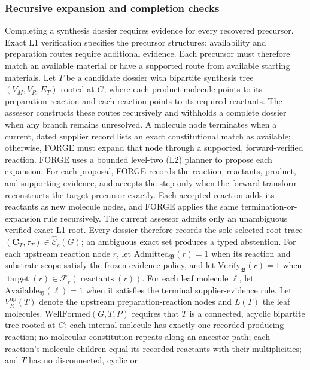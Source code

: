\subsubsection{Recursive expansion and completion checks}

Completing a synthesis dossier requires evidence for every recovered precursor. Exact L1
verification specifies the precursor structures; availability and preparation routes require
additional evidence. Each precursor must therefore match an available material or have a supported
route from available starting materials.
Let $T$ be a candidate dossier with bipartite synthesis tree $(V_M,V_R,E_T)$ rooted at $G$, where each product molecule
points to its preparation reaction and each reaction points to its required reactants.
The assessor constructs these routes recursively and withholds a complete dossier when any branch
remains unresolved.
A molecule node terminates when a current, dated supplier record lists an exact constitutional match
as available; otherwise, FORGE must expand that node through a supported, forward-verified reaction.
FORGE uses a bounded level-two (L2) planner to propose each expansion.
For each proposal, FORGE records the reaction, reactants, product, and supporting evidence, and
accepts the step only when the forward transform reconstructs the target precursor exactly.
Each accepted reaction adds its reactants as new molecule nodes, and FORGE applies the same
termination-or-expansion rule recursively.
The current assessor admits only an unambiguous verified exact-L1 root. Every dossier therefore
records the sole selected root trace
$(\mathbf C_T,\tau_T)\in\widehat{\mathcal E}_c(G)$; an ambiguous exact set produces a typed
abstention. For each upstream reaction node $r$, let
$\mathrm{Admitted}_{\mathfrak B}(r)=1$ when its reaction and substrate scope satisfy the frozen
evidence policy, and let $\mathrm{Verify}_{\mathfrak B}(r)=1$ when
$\operatorname{target}(r)\in\mathcal F_r(\operatorname{reactants}(r))$.
For each leaf molecule $\ell$, let $\mathrm{Available}_{\mathfrak B}(\ell)=1$ when it satisfies the terminal
supplier-evidence rule.
Let $V_R^{\mathrm{up}}(T)$ denote the upstream preparation-reaction nodes and $L(T)$ the leaf
molecules. $\mathrm{WellFormed}(G,T,P)$ requires that $T$ is a connected, acyclic bipartite tree
rooted at $G$; each internal molecule has exactly one recorded producing reaction; no molecular constitution repeats along an ancestor path; each reaction's
molecule children equal its recorded reactants with their multiplicities; and $T$ has no disconnected, cyclic or
